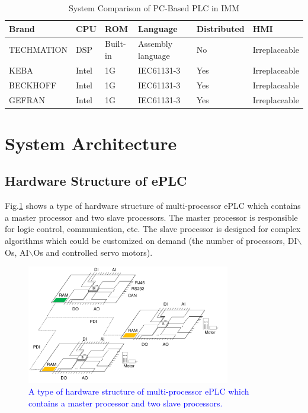 \documentclass[journal,UTF8]{IEEEtran}
\begin{document}
\begin{table}
	\scriptsize \caption{System Comparison of PC-Based PLC in IMM}
	\label{table:IMMControllor}
	\begin{center}
		\renewcommand{\arraystretch}{1.4}
		\setlength\tabcolsep{3pt}
		\begin{tabular}{|p{1.6cm}|p{0.5cm}|p{0.8cm}|p{2cm}|p{1.1cm}|p{1.3cm}|}
			\hline
			Brand       & CPU    & ROM & Language       & Distributed  & HMI\\
			\hline
			TECHMATION  & DSP    & Built-in  & Assembly language        &No  & Irreplaceable \\
			\hline
			KEBA        & Intel  & 1G  & IEC61131-3                 &Yes    & Irreplaceable\\
			\hline
			BECKHOFF    & Intel  & 1G  & IEC61131-3               &Yes   &Irreplaceable\\
			\hline
			GEFRAN      & Intel  & 1G  &IEC61131-3                 &Yes   &Irreplaceable\\
			\hline
		\end{tabular}
	\end{center}
\end{table}
\section{System Architecture}
\label{MultiProcessorePLC}
\subsection{Hardware Structure of ePLC}
Fig.\ref{fig:HardwareStructure} shows a type of hardware structure of multi-processor ePLC which contains a master processor and two slave processors. The master processor is responsible for logic control, communication, etc. The slave processor is designed for complex algorithms which could be customized on demand (the number of processors, DI$\backslash$Os, AI$\backslash$Os and controlled servo motors).
\begin{figure}
	\centering
	\includegraphics[width=3.5in]{fig/FIG2.pdf}
	\caption{ \textcolor{blue}{A type of hardware structure of multi-processor ePLC which contains a master processor and two slave processors.}}
	\label{fig:HardwareStructure}
\end{figure}
\end{document}

